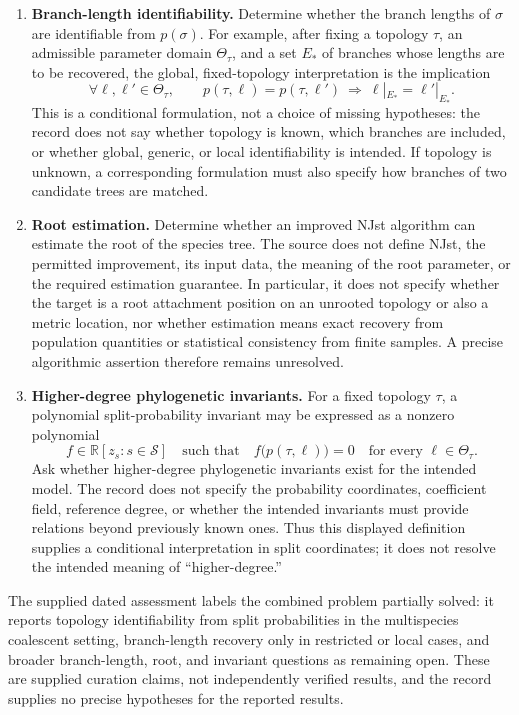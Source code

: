 \documentclass[11pt]{article}
\newcommand{\R}{\mathbb{R}}
\begin{document}
\begin{enumerate}
\item \textbf{Branch-length identifiability.} Determine whether the branch lengths of \(\sigma\) are identifiable from \(p(\sigma)\). For example, after fixing a topology \(\tau\), an admissible parameter domain \(\Theta_\tau\), and a set \(E_*\) of branches whose lengths are to be recovered, the global, fixed-topology interpretation is the implication
\[
 \forall\ell,\ell'\in\Theta_\tau,\qquad
 p(\tau,\ell)=p(\tau,\ell')
 \ \Longrightarrow\ 
 \ell|_{E_*}=\ell'|_{E_*}.
\]
This is a conditional formulation, not a choice of missing hypotheses: the record does not say whether topology is known, which branches are included, or whether global, generic, or local identifiability is intended. If topology is unknown, a corresponding formulation must also specify how branches of two candidate trees are matched.
\item \textbf{Root estimation.} Determine whether an improved NJst algorithm can estimate the root of the species tree. The source does not define NJst, the permitted improvement, its input data, the meaning of the root parameter, or the required estimation guarantee. In particular, it does not specify whether the target is a root attachment position on an unrooted topology or also a metric location, nor whether estimation means exact recovery from population quantities or statistical consistency from finite samples. A precise algorithmic assertion therefore remains unresolved.
\item \textbf{Higher-degree phylogenetic invariants.} For a fixed topology \(\tau\), a polynomial split-probability invariant may be expressed as a nonzero polynomial
\[
 f\in\R[z_s:s\in\mathcal S]
 \quad\text{such that}\quad
 f\bigl(p(\tau,\ell)\bigr)=0
 \quad\text{for every }\ell\in\Theta_\tau.
\]
Ask whether higher-degree phylogenetic invariants exist for the intended model. The record does not specify the probability coordinates, coefficient field, reference degree, or whether the intended invariants must provide relations beyond previously known ones. Thus this displayed definition supplies a conditional interpretation in split coordinates; it does not resolve the intended meaning of ``higher-degree.''
\end{enumerate}

The supplied dated assessment labels the combined problem partially solved: it reports topology identifiability from split probabilities in the multispecies coalescent setting, branch-length recovery only in restricted or local cases, and broader branch-length, root, and invariant questions as remaining open. These are supplied curation claims, not independently verified results, and the record supplies no precise hypotheses for the reported results.
\end{document}
